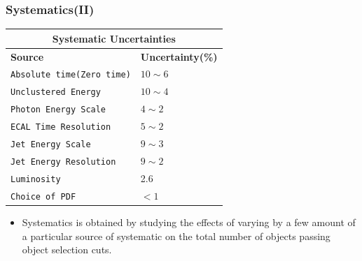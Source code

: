 \documentclass{beamer}
\begin{document}
\begin{frame}
\frametitle{\Huge Systematics(II)}
\begin{minipage}[t]{0.8\textwidth}
\centering
\begin{tabular}{l l}
\multicolumn{2}{c}{\bfseries{Systematic Uncertainties}} \\
  \hline 
   \bfseries{Source} & \bfseries{Uncertainty(\%)} \\
   \hline
   \texttt{Absolute time(Zero time)}& $10\sim 6$  \\
   \texttt{Unclustered Energy}&  $10 \sim 4 $  \\
   \texttt{Photon Energy Scale}& $ 4 \sim 2$  \\
   \texttt{ECAL Time Resolution}& $ 5 \sim 2 $   \\
   \texttt{Jet Energy Scale}& $9 \sim 3$   \\
   \texttt{Jet Energy Resolution}& $ 9 \sim 2 $  \\
   \hline
   \texttt{Luminosity} & 2.6    \\
   \texttt{Choice of PDF} & $ < 1$ \\
  \hline \hline
 \end{tabular} 
 \end{minipage}
 
 \begin{minipage}[b]{0.8\textwidth}
 \begin{itemize}
  \item Systematics is obtained by studying the effects of varying by a few amount of a particular source of systematic on the total number of objects passing object selection cuts.
   \end{itemize}
 \end{minipage}
\end{frame}

\end{document}
